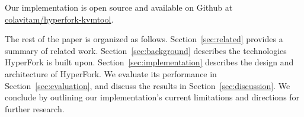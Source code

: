 Our implementation is open source and available on Github at
\href{https://github.com/colavitam/hyperfork-kvmtool}{colavitam/hyperfork-kvmtool}.

The rest of the paper is organized as follows. Section~\ref{sec:related}
provides a summary of related work. Section~\ref{sec:background} describes the
technologies HyperFork is built upon. Section~\ref{sec:implementation}
describes the design and architecture of HyperFork. We evaluate its performance
in Section~\ref{sec:evaluation}, and discuss the results in
Section~\ref{sec:discussion}. We conclude by outlining our implementation's
current limitations and directions for further research.
